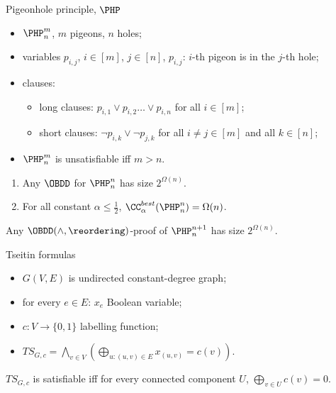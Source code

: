 \begin{frame}{Pigeonhole principle, $\PHP$}

	\begin{itemize}
        \item $\PHP^m_n$, $m$ pigeons, $n$ holes;
        \item variables $p_{i, j}$, $i \in [m]$, $j \in [n]$, $p_{i, j}$: $i$-th pigeon is in the $j$-th
            hole;
        \item clauses:
        	\begin{itemize}
                \item {\color{blue} long} clauses:
                    $p_{i, 1} \lor p_{i, 2} \dots \lor p_{i, n}$ for all $i \in [m]$;
                \item {\color{blue} short} clauses: $\lnot p_{i, k} \lor \lnot p_{j, k}$ for all $i \neq j
                    \in [m]$ and all $k \in [n]$;
            \end{itemize}
        \item $\PHP^m_n$ is unsatisfiable iff $m > n$.
    \end{itemize}

    \pause
    \begin{lemma}
        \begin{enumerate}
            \item Any $\OBDD$ for $\PHP^n_n$ has size $2^{\Omega(n)}$.
            \item For all constant $\alpha \le \frac{1}{2}$, $\CC^{best}_{\alpha}(\PHP^n_n) = \Omega(n)$.
        \end{enumerate}
    \end{lemma}

    \pause

    \begin{theorem}
        Any $\OBDD(\land, \reordering)$-proof of $\PHP^{n+1}_n$ has size $2^{\Omega(n)}$.
    \end{theorem}

\end{frame}


\begin{frame}{Tseitin formulas}
	\begin{itemize}
        \item $G(V, E)$ is undirected constant-degree graph;
        \item for every $e \in E$: $x_e$ Boolean variable;
        \item $c: V \to \{0, 1\}$ labelling function;
        \item $TS_{G, c} = \bigwedge\limits_{v \in V} \left( \bigoplus\limits_{u: (u, v) \in E}
            x_{(u, v)} = c(v) \right)$.
    \end{itemize}

    \begin{Lemma}
        $TS_{G, c}$ is satisfiable iff for every connected component $U$, $\bigoplus\limits_{v \in U}
        c(v) = 0$.
    \end{Lemma}
\end{frame}


